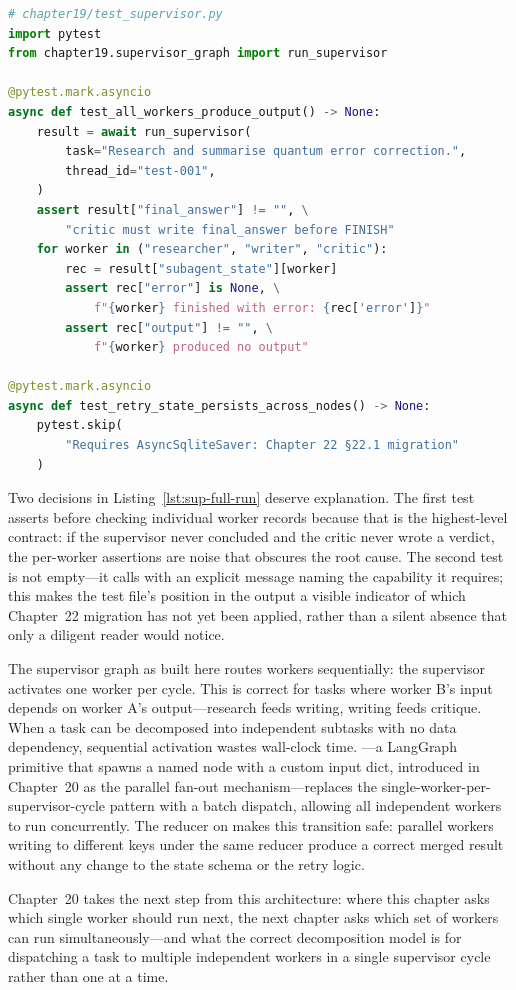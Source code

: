 \begin{lstlisting}[language=Python,
  caption={Integration test: all three workers produce output},
  label={lst:sup-full-run}]
# chapter19/test_supervisor.py
import pytest
from chapter19.supervisor_graph import run_supervisor

@pytest.mark.asyncio
async def test_all_workers_produce_output() -> None:
    result = await run_supervisor(
        task="Research and summarise quantum error correction.",
        thread_id="test-001",
    )
    assert result["final_answer"] != "", \
        "critic must write final_answer before FINISH"
    for worker in ("researcher", "writer", "critic"):
        rec = result["subagent_state"][worker]
        assert rec["error"] is None, \
            f"{worker} finished with error: {rec['error']}"
        assert rec["output"] != "", \
            f"{worker} produced no output"

@pytest.mark.asyncio
async def test_retry_state_persists_across_nodes() -> None:
    pytest.skip(
        "Requires AsyncSqliteSaver: Chapter 22 §22.1 migration"
    )
\end{lstlisting}

Two decisions in Listing~\ref{lst:sup-full-run} deserve explanation.
The first test asserts  before checking
individual worker records because that is the highest-level contract: if
the supervisor never concluded and the critic never wrote a verdict, the
per-worker assertions are noise that obscures the root cause. The second
test is not empty---it calls \code{pytest.skip()} with an explicit message
naming the capability it requires; this makes the test file's position in
the \code{pytest} output a visible indicator of which Chapter~22 migration
has not yet been applied, rather than a silent absence that only a diligent
reader would notice.

\begin{notebox}
The supervisor graph as built here routes workers sequentially: the
supervisor activates one worker per cycle. This is correct for tasks where
worker B's input depends on worker A's output---research feeds writing,
writing feeds critique. When a task can be decomposed into independent
subtasks with no data dependency, sequential activation wastes wall-clock
time. \code{Send}---a LangGraph primitive that spawns a named node with a
custom input dict, introduced in Chapter~20 as the parallel fan-out
mechanism---replaces the single-worker-per-supervisor-cycle pattern with a
batch dispatch, allowing all independent workers to run concurrently. The
\code{operator.or\_} reducer on \code{subagent\_state} makes this
transition safe: parallel workers writing to different keys under the same
reducer produce a correct merged result without any change to the state
schema or the retry logic.
\end{notebox}

Chapter~20 takes the next step from this architecture: where this chapter
asks which single worker should run next, the next chapter asks which set
of workers can run simultaneously---and what the correct decomposition
model is for dispatching a task to multiple independent workers in a single
supervisor cycle rather than one at a time.
